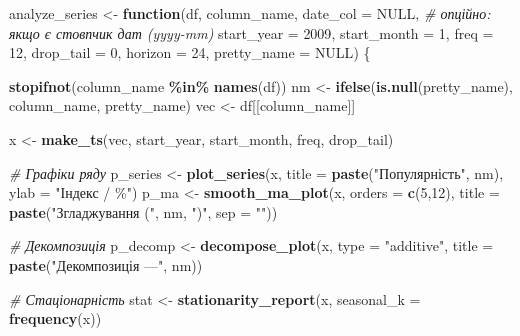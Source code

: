 \documentclass[
]{article}
\newenvironment{Shaded}{\begin{snugshade}}{\end{snugshade}}
\newcommand{\AttributeTok}[1]{\textcolor[rgb]{0.13,0.29,0.53}{#1}}
\newcommand{\CommentTok}[1]{\textcolor[rgb]{0.56,0.35,0.01}{\textit{#1}}}
\newcommand{\ConstantTok}[1]{\textcolor[rgb]{0.56,0.35,0.01}{#1}}
\newcommand{\ControlFlowTok}[1]{\textcolor[rgb]{0.13,0.29,0.53}{\textbf{#1}}}
\newcommand{\DecValTok}[1]{\textcolor[rgb]{0.00,0.00,0.81}{#1}}
\newcommand{\FunctionTok}[1]{\textcolor[rgb]{0.13,0.29,0.53}{\textbf{#1}}}
\newcommand{\NormalTok}[1]{#1}
\newcommand{\OtherTok}[1]{\textcolor[rgb]{0.56,0.35,0.01}{#1}}
\newcommand{\SpecialCharTok}[1]{\textcolor[rgb]{0.81,0.36,0.00}{\textbf{#1}}}
\newcommand{\StringTok}[1]{\textcolor[rgb]{0.31,0.60,0.02}{#1}}
\begin{document}
\begin{Shaded}
\begin{Highlighting}[]
\NormalTok{analyze\_series }\OtherTok{\textless{}{-}} \ControlFlowTok{function}\NormalTok{(df, column\_name,}
                           \AttributeTok{date\_col =} \ConstantTok{NULL}\NormalTok{,         }\CommentTok{\# опційно: якщо є стовпчик дат (yyyy{-}mm)}
                           \AttributeTok{start\_year =} \DecValTok{2009}\NormalTok{,}
                           \AttributeTok{start\_month =} \DecValTok{1}\NormalTok{,}
                           \AttributeTok{freq =} \DecValTok{12}\NormalTok{,}
                           \AttributeTok{drop\_tail =} \DecValTok{0}\NormalTok{,}
                           \AttributeTok{horizon =} \DecValTok{24}\NormalTok{,}
                           \AttributeTok{pretty\_name =} \ConstantTok{NULL}\NormalTok{) \{}
  
  \FunctionTok{stopifnot}\NormalTok{(column\_name }\SpecialCharTok{\%in\%} \FunctionTok{names}\NormalTok{(df))}
\NormalTok{  nm }\OtherTok{\textless{}{-}} \FunctionTok{ifelse}\NormalTok{(}\FunctionTok{is.null}\NormalTok{(pretty\_name), column\_name, pretty\_name)}
\NormalTok{  vec }\OtherTok{\textless{}{-}}\NormalTok{ df[[column\_name]]}
  
\NormalTok{  x }\OtherTok{\textless{}{-}} \FunctionTok{make\_ts}\NormalTok{(vec, start\_year, start\_month, freq, drop\_tail)}
  
  \CommentTok{\# Графіки ряду}
\NormalTok{  p\_series }\OtherTok{\textless{}{-}} \FunctionTok{plot\_series}\NormalTok{(x, }\AttributeTok{title =} \FunctionTok{paste}\NormalTok{(}\StringTok{"Популярність"}\NormalTok{, nm), }\AttributeTok{ylab =} \StringTok{"Індекс / \%"}\NormalTok{)}
\NormalTok{  p\_ma     }\OtherTok{\textless{}{-}} \FunctionTok{smooth\_ma\_plot}\NormalTok{(x, }\AttributeTok{orders =} \FunctionTok{c}\NormalTok{(}\DecValTok{5}\NormalTok{,}\DecValTok{12}\NormalTok{), }\AttributeTok{title =} \FunctionTok{paste}\NormalTok{(}\StringTok{"Згладжування ("}\NormalTok{, nm, }\StringTok{")"}\NormalTok{, }\AttributeTok{sep =} \StringTok{""}\NormalTok{))}
  
  \CommentTok{\# Декомпозиція}
\NormalTok{  p\_decomp }\OtherTok{\textless{}{-}} \FunctionTok{decompose\_plot}\NormalTok{(x, }\AttributeTok{type =} \StringTok{"additive"}\NormalTok{, }\AttributeTok{title =} \FunctionTok{paste}\NormalTok{(}\StringTok{"Декомпозиція —"}\NormalTok{, nm))}
  
  \CommentTok{\# Стаціонарність}
\NormalTok{  stat }\OtherTok{\textless{}{-}} \FunctionTok{stationarity\_report}\NormalTok{(x, }\AttributeTok{seasonal\_k =} \FunctionTok{frequency}\NormalTok{(x))}
  

\end{Highlighting}
\end{Shaded}
\end{document}
